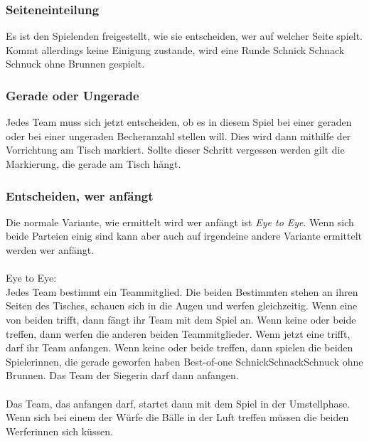 \documentclass[a5paper, 12pt]{book}
\begin{document}
\subsubsection{Seiteneinteilung}\label{subsub:seiteneinteilung}
Es ist den Spielenden freigestellt, wie sie entscheiden, wer auf welcher Seite spielt. Kommt allerdings keine Einigung zustande, wird eine Runde Schnick Schnack Schnuck ohne Brunnen gespielt.
\subsubsection{Gerade oder Ungerade}\label{subsub:geradeoderungerade}
Jedes Team muss sich jetzt entscheiden, ob es in diesem Spiel bei einer geraden oder bei einer ungeraden Becheranzahl stellen will. Dies wird dann mithilfe der Vorrichtung am Tisch markiert. Sollte dieser Schritt vergessen werden gilt die Markierung, die gerade am Tisch hängt.
\subsubsection{Entscheiden, wer anfängt}\label{subsub:entscheidenweranfängt}
Die normale Variante, wie ermittelt wird wer anfängt ist \textit{Eye to Eye}. Wenn sich beide Parteien einig sind kann aber auch auf irgendeine andere Variante ermittelt werden wer anfängt. \\\\
Eye to Eye:\\
Jedes Team bestimmt ein Teammitglied. Die beiden Bestimmten stehen an ihren Seiten des Tisches, schauen sich in die Augen und werfen gleichzeitig. Wenn eine von beiden trifft, dann fängt ihr Team mit dem Spiel an. Wenn keine oder beide treffen, dann werfen die anderen beiden Teammitglieder. Wenn jetzt eine trifft, darf ihr Team anfangen. Wenn keine oder beide treffen, dann spielen die beiden Spielerinnen, die gerade geworfen haben Best-of-one SchnickSchnackSchnuck ohne Brunnen. Das Team der Siegerin darf dann anfangen. \\\\Das Team, das anfangen darf, startet dann mit dem Spiel in der Umstellphase.\\
Wenn sich bei einem der Würfe die Bälle in der Luft treffen müssen die beiden Werferinnen sich küssen.
\end{document}
